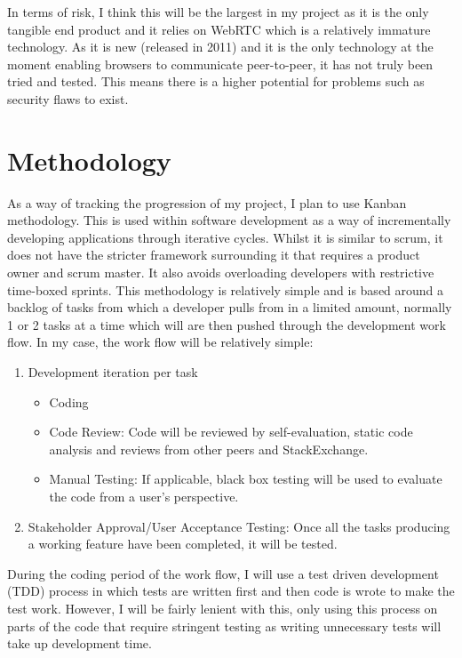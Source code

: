 \documentclass[]{report}
\begin{document}
		In terms of risk, I think this will be the largest in my project as it is the only tangible end product and it relies on WebRTC which is a relatively immature technology. As it is new (released in 2011) and it is the only technology at the moment enabling browsers to communicate peer-to-peer, it has not truly been tried and tested. This means there is a higher potential for problems such as security flaws to exist. 
			
	\section{Methodology}
		As a way of tracking the progression of my project, I plan to use Kanban methodology. This is used within software development as a way of incrementally developing applications through iterative cycles. Whilst it is similar to scrum, it does not have the stricter framework surrounding it that requires a product owner and scrum master. It also avoids overloading developers with restrictive time-boxed sprints. This methodology is relatively simple and is based around a backlog of tasks from which a developer pulls from in a limited amount, normally 1 or 2 tasks at a time which will are then pushed through the development work flow. In my case, the work flow will be relatively simple:
		\begin{enumerate}
			\item Development iteration per task
			\begin{itemize}
				\item Coding
				\item Code Review: Code will be reviewed by self-evaluation, static code analysis and reviews from other peers and StackExchange.
				\item Manual Testing: If applicable, black box testing will be used to evaluate the code from a user's perspective.
			\end{itemize}
			\item Stakeholder Approval/User Acceptance Testing: Once all the tasks producing a working feature have been completed, it will be tested. 
		\end{enumerate}
		During the coding period of the work flow, I will use a test driven development (TDD) process in which tests are written first and then code is wrote to make the test work. However, I will be fairly lenient with this, only using this process on parts of the code that require stringent testing as writing unnecessary tests will take up development time. 
\end{document}
